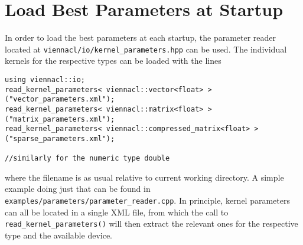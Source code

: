 \section{Load Best Parameters at Startup}
In order to load the best parameters at each startup, the parameter reader located at \texttt{viennacl/io/kernel\_parameters.hpp} can be used.
The individual kernels for the respective {\ViennaCL} types can be loaded with the lines
\begin{lstlisting}
using viennacl::io;
read_kernel_parameters< viennacl::vector<float> >("vector_parameters.xml");
read_kernel_parameters< viennacl::matrix<float> >("matrix_parameters.xml");
read_kernel_parameters< viennacl::compressed_matrix<float> >("sparse_parameters.xml");

//similarly for the numeric type double
\end{lstlisting}
where the filename is as usual relative to current working directory. A simple example doing just that can be found in \texttt{examples/parameters/parameter\_reader.cpp}.
In principle, kernel parameters can all be located in a single XML file, from which the call to \lstinline|read_kernel_parameters()| will then extract the relevant ones for the respective
{\ViennaCL} type and the available device.

